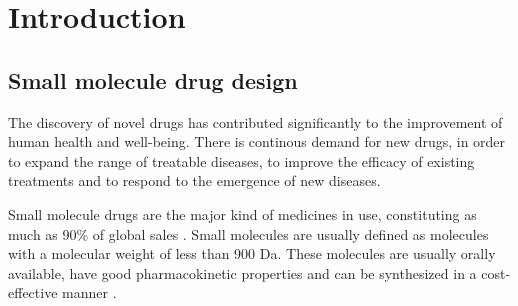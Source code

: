 \chapter{Introduction\label{chap:introduction}}

\section{Small molecule drug design\label{sec:drug-design}} The discovery of novel drugs has
contributed significantly to the improvement of human health and well-being. There is continous
demand for new drugs, in order to expand the range of treatable diseases, to improve the efficacy of
existing treatments and to respond to the emergence of new diseases.

Small molecule drugs are the major kind of medicines in use, constituting as much as 90\% of global
sales \citep{makurvetBiologicsVsSmall2021}. Small molecules are usually defined as molecules with a
molecular weight of less than 900 Da. These molecules are usually orally available, have good
pharmacokinetic properties and can be synthesized in a cost-effective manner \citep{todo}.

